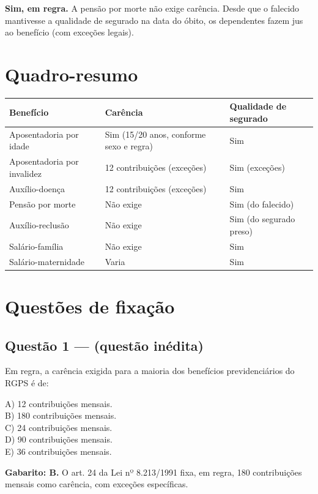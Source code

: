 \documentclass[11pt,a4paper]{article}
\begin{document}
\textbf{Sim, em regra.} A pensão por morte não exige carência. Desde que o falecido mantivesse a qualidade de segurado na data do óbito, os dependentes fazem jus ao benefício (com exceções legais).

\section*{Quadro-resumo}

\begin{tabularx}{\linewidth}{llX}
\toprule
 \textbf{Benefício} & \textbf{Carência} & \textbf{Qualidade de segurado} \\
\midrule
 Aposentadoria por idade & Sim (15/20 anos, conforme sexo e regra) & Sim \\
 Aposentadoria por invalidez & 12 contribuições (exceções) & Sim (exceções) \\
 Auxílio-doença & 12 contribuições (exceções) & Sim \\
 Pensão por morte & Não exige & Sim (do falecido) \\
 Auxílio-reclusão & Não exige & Sim (do segurado preso) \\
 Salário-família & Não exige & Sim \\
 Salário-maternidade & Varia & Sim \\
\bottomrule
\end{tabularx}


\section*{Questões de fixação}

\subsection*{Questão 1 — (questão inédita)}

Em regra, a carência exigida para a maioria dos benefícios previdenciários do RGPS é de:

A) 12 contribuições mensais. \\ B) 180 contribuições mensais. \\ C) 24 contribuições mensais. \\ D) 90 contribuições mensais. \\ E) 36 contribuições mensais.

\begin{alerta}
\textbf{Gabarito: B.} O art. 24 da Lei nº 8.213/1991 fixa, em regra, 180 contribuições mensais como carência, com exceções específicas.
\end{alerta}
\end{document}
